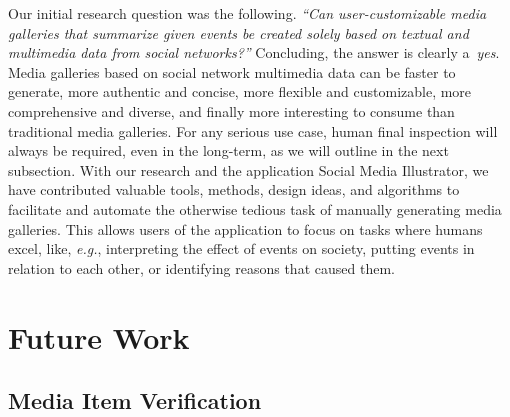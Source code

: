 Our initial research question was the following.
\textit{``Can user-customizable media galleries
that summarize given events be
created solely based on textual and multimedia data
from social networks?''}
Concluding, the answer is clearly a~\emph{yes}.
Media galleries based on social network multimedia data 
can be faster to generate, more authentic and concise,
more flexible and customizable, more comprehensive and diverse, and finally more interesting to consume than
traditional media galleries.
For any serious use case, human final inspection will
always be required, even in the long-term,
as we will outline in the next subsection.
With our research and the application Social Media Illustrator,
we have contributed valuable tools,
methods, design ideas, and algorithms
to facilitate and automate the otherwise tedious task
of manually generating media galleries.
This allows users of the application
to focus on tasks where humans excel,
like, \emph{e.g.}, interpreting the effect of events on society,
putting events in relation to each other,
or identifying reasons that caused them.

\section{Future Work}

\subsection{Media Item Verification}

